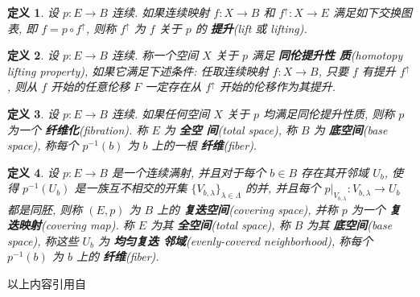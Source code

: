 \documentclass[UTF8]{ctexart}
\newtheorem*{defn}{定义}
\begin{document}
\begin{defn}
设 $p : E \to B$ 连续. 如果连续映射 $f : X \to B$ 和 $f^\uparrow : X
\to E$ 满足如下交换图表, 即 $f = p \circ f^\uparrow$, 则称
$f^\uparrow$ 为 $f$ 关于 $p$ 的 \textbf{提升}(lift 或 lifting).
\begin{center}
\end{center}
\end{defn}

\begin{defn}
设 $p : E \to B$ 连续. 称一个空间 $X$ 关于 $p$ 满足 \textbf{同伦提升性
  质}(homotopy lifting property), 如果它满足下述条件: 任取连续映射 $f
: X \to B$, 只要 $f$ 有提升 $f^\uparrow$, 则从 $f$ 开始的任意伦移 $F$
一定存在从 $f^\uparrow$ 开始的伦移作为其提升.
\end{defn}
\begin{center}
\end{center}

\begin{defn}
设 $p : E \to B$ 连续. 如果任何空间 $X$ 关于 $p$ 均满足同伦提升性质,
则称 $p$ 为一个 \textbf{纤维化}(fibration). 称 $E$ 为 \textbf{全空
  间}(total space), 称 $B$ 为 \textbf{底空间}(base space), 称每个
$p^{-1}(b)$ 为 $b$ 上的一根 \textbf{纤维}(fiber).
\end{defn}

\begin{defn}
设 $p : E \to B$ 是一个连续满射, 并且对于每个 $b \in B$ 存在其开邻域
$U_b$, 使得 $p^{-1}(U_b)$ 是一族互不相交的开集
$\{V_{b,\lambda}\}_{\lambda \in \Lambda}$ 的并, 并且每个
$p|_{V_{b,\lambda}} : V_{b,\lambda} \to U_b$ 都是同胚, 则称 $(E,p)$ 为
$B$ 上的 \textbf{复迭空间}(covering space), 并称 $p$ 为一个 \textbf{复
  迭映射}(covering map). 称 $E$ 为其 \textbf{全空间}(total space), 称
$B$ 为其 \textbf{底空间}(base space), 称这些 $U_b$ 为 \textbf{均匀复迭
  邻域}(evenly-covered neighborhood), 称每个 $p^{-1}(b)$ 为 $b$ 上的
\textbf{纤维}(fiber).
\end{defn}

以上内容引用自\parencite{包志强2013点集拓扑与代数拓扑引论}
\end{document}
